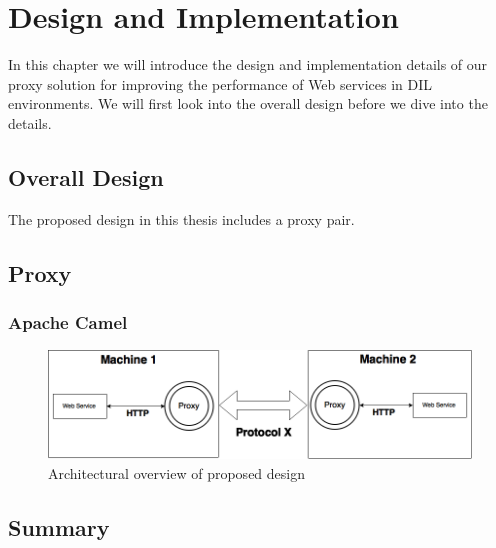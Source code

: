 \chapter{Design and Implementation}

In this chapter we will introduce the design and implementation details of our
proxy solution for improving the performance of Web services in DIL
environments. We will first look into the overall design before we dive into the
details.

\section{Overall Design}

The proposed design in this thesis includes a proxy pair.


\section{Proxy}

\subsection{Apache Camel}

\begin{figure}[h]
\includegraphics[scale=0.4]{images/architecture.png}
\caption{Architectural overview of proposed design}
\end{figure}


\section{Summary}
